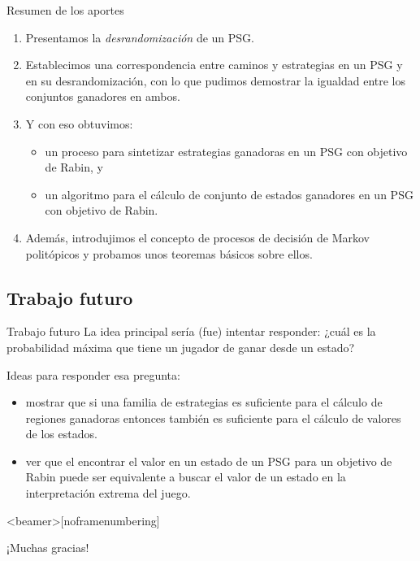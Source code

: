 \documentclass{beamer}
\newenvironment{noheadline}{
    \setbeamertemplate{headline}{}
    \addtobeamertemplate{frametitle}{\vspace*{-0.9\baselineskip}}{}
}{}
\begin{document}
\begin{frame}{Resumen de los aportes}
	\pause
	\begin{enumerate}
		\item Presentamos la \textit{desrandomizaci\'on} de un PSG. \pause
		\item Establecimos una correspondencia entre caminos y estrategias en un PSG y en su
		      desrandomizaci\'on, con lo que pudimos demostrar la igualdad entre los
		      conjuntos ganadores en ambos. \pause
		\item Y con eso obtuvimos:
		      \begin{itemize}
			      \pause
			      \item un proceso para sintetizar estrategias ganadoras en un PSG con objetivo de
			            Rabin, y \pause
			      \item un algoritmo para el c\'alculo de conjunto de estados ganadores en un PSG con
			            objetivo de Rabin. \pause
		      \end{itemize}
		\item Además, introdujimos el concepto de procesos de decisión de Markov politópicos
		      y probamos unos teoremas básicos sobre ellos.
	\end{enumerate}
\end{frame}

\subsection{Trabajo futuro}

\begin{frame}{Trabajo futuro}
	\pause
	La idea principal ser\'ia (fue) intentar responder: ¿cu\'al es la probabilidad
	m\'axima que tiene un jugador de ganar desde un estado? \pause

	Ideas para responder esa pregunta:
	\begin{itemize}
		\item mostrar que si una familia de estrategias es suficiente para el c\'alculo de
		      regiones ganadoras entonces tambi\'en es suficiente para el c\'alculo de
		      valores de los estados. \pause
		\item ver que el encontrar el valor en un estado de un PSG para un objetivo de Rabin
		      puede ser equivalente a buscar el valor de un estado en la interpretaci\'on
		      extrema del juego.
	\end{itemize}
\end{frame}

\begingroup %
\begin{noheadline}
	\begin{frame}<beamer>[noframenumbering]
		\begin{center}
			¡Muchas gracias!
		\end{center}
	\end{frame}
\end{noheadline}

\endgroup
\end{document}
